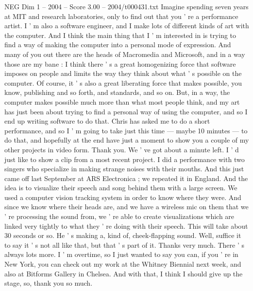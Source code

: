 \begin{textsample}{NEG Dim 1 – 2004 – Score 3.00 – 2004/t000431.txt}  \label{ex:f1_neg_057}
Imagine spending seven years at MIT and research laboratories, only to find out that you ' re a performance artist.
I ' m also a software engineer, and I make lots of different kinds of art with the computer.
And I think the main thing that I ' m interested in is trying to find a way of making the computer into a personal mode of expression.
And many of you out there are the heads of Macromedia and Microsoft, and in a way those are my bane : I think there ' s a great homogenizing force that software imposes on people and limits the way they think about what ' s possible on the computer.
Of course, it ' s also a great liberating force that makes possible, you know, publishing and so forth, and standards, and so on.
But, in a way, the computer makes possible much more than what most people think, and my art has just been about trying to find a personal way of using the computer, and so I end up writing software to do that.
Chris has asked me to do a short performance, and so I ' m going to take just this time — maybe 10 minutes — to do that, and hopefully at the end have just a moment to show you a couple of my other projects in video form.
Thank you.
We ' ve got about a minute left.
I ' d just like to show a clip from a most recent project.
I did a performance with two singers who specialize in making strange noises with their mouths.
And this just came off last September at ARS Electronica ; we repeated it in England.
And the idea is to visualize their speech and song behind them with a large screen.
We used a computer vision tracking system in order to know where they were.
And since we know where their heads are, and we have a wireless mic on them that we ' re processing the sound from, we ' re able to create visualizations which are linked very tightly to what they ' re doing with their speech.
This will take about 30 seconds or so.
He ' s making a, kind of, cheek-flapping sound.
Well, suffice it to say it ' s not all like that, but that ' s part of it.
Thanks very much.
There ' s always lots more.
I ' m overtime, so I just wanted to say you can, if you ' re in New York, you can check out my work at the Whitney Biennial next week, and also at Bitforms Gallery in Chelsea.
And with that, I think I should give up the stage, so, thank you so much.

\end{textsample}

